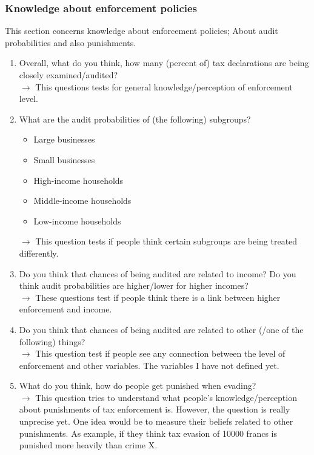 \documentclass[12pt]{article}
\begin{document}
\subsubsection{Knowledge about enforcement policies}
This section concerns knowledge about enforcement policies; About audit probabilities and also punishments.
\begin{enumerate}
    \item Overall, what do you think, how many (percent of) tax declarations are being closely examined/audited? \\$\rightarrow$ This questions tests for general knowledge/perception of enforcement level.
    \item What are the audit probabilities of (the following) subgroups? 
    \begin{itemize}
        \item Large businesses
        \item Small businesses
        \item High-income households
        \item Middle-income households
        \item Low-income households
    \end{itemize} $\rightarrow$ This question tests if people think certain subgroups are being treated differently.
    \item Do you think that chances of being audited are related to income?  Do you think audit probabilities are higher/lower for higher incomes? \\ $\rightarrow$ These questions test if people think there is a link between higher enforcement and income. 
    \item Do you think that chances of being audited are related to other (/one of the following) things? \\ $\rightarrow$ This question test if people see any connection between the level of enforcement and other variables. The variables I have not defined yet. 
    \item What do you think, how do people get punished when evading? \\ $\rightarrow$ This question tries to understand what people's knowledge/perception about punishments of tax enforcement is. However, the question is really unprecise yet. One idea would be to measure their beliefs related to other punishments. As example, if they think tax evasion of 10000 francs is punished more heavily than crime X. 
\end{enumerate}
\end{document}
